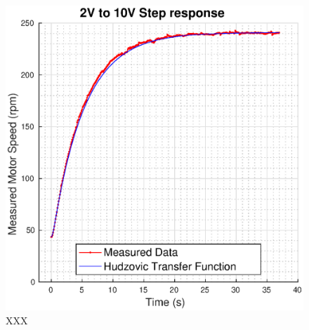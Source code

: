 \begin{figure}
    \centering
    \includegraphics[width=\linewidth]{images/hudzovic}
    \caption{XXX}
\end{figure}


